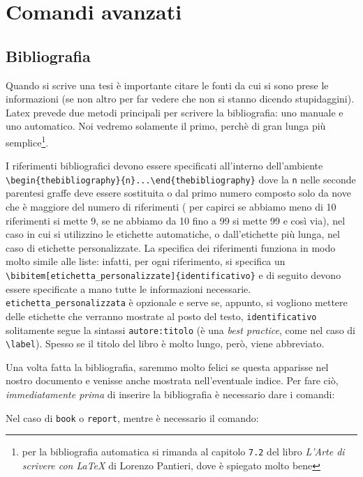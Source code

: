 \chapter{Comandi avanzati}

\section{Bibliografia}
Quando si scrive una tesi è importante citare le fonti da cui si sono prese le 
informazioni (se non altro per far vedere che non si stanno dicendo 
stupidaggini). Latex prevede due metodi principali per scrivere la 
bibliografia: uno manuale e uno automatico. Noi vedremo solamente il primo, 
perchè di gran lunga più semplice\footnote{per la bibliografia automatica si 
rimanda al capitolo \texttt{7.2} del libro \textit{L'Arte di scrivere con 
\LaTeX{}} di Lorenzo Pantieri, dove è spiegato molto bene}.
\par I riferimenti bibliografici devono essere specificati all'interno 
dell'ambiente \\\verb!\begin{thebibliography}{n}...\end{thebibliography}! dove 
la \texttt{n} nelle seconde parentesi graffe deve essere sostituita o dal 
primo numero composto solo da nove che è maggiore del numero di riferimenti (
per capirci se abbiamo meno di 10 riferimenti si mette 9, se ne abbiamo da 10 
fino a 99 si mette 99 e così via), nel caso in cui si utilizzino le etichette 
automatiche, o dall'etichette più lunga, nel caso di etichette personalizzate. 
La specifica dei riferimenti funziona in modo molto simile alle liste: 
infatti, per ogni riferimento, si specifica un 
\verb!\bibitem[etichetta_personalizzate]{identificativo}! e di seguito devono 
essere specificate a mano tutte le informazioni necessarie. 
\verb!etichetta_personalizzata! è opzionale e serve se, appunto, si vogliono 
mettere delle etichette che verranno mostrate al posto del testo, 
\verb!identificativo! solitamente segue la sintassi \verb!autore:titolo! (è 
una \textit{best practice}, come nel caso di \verb!\label!). Spesso se il 
titolo del libro è molto lungo, però, viene abbreviato. 
\par Una volta fatta la bibliografia, saremmo molto felici se questa apparisse 
nel nostro documento e venisse anche mostrata nell'eventuale indice. Per fare 
ciò, \emph{immediatamente prima} di inserire la bibliografia è necessario dare 
i comandi:

Nel caso di \verb!book! o \verb!report!, mentre è necessario il comando:
